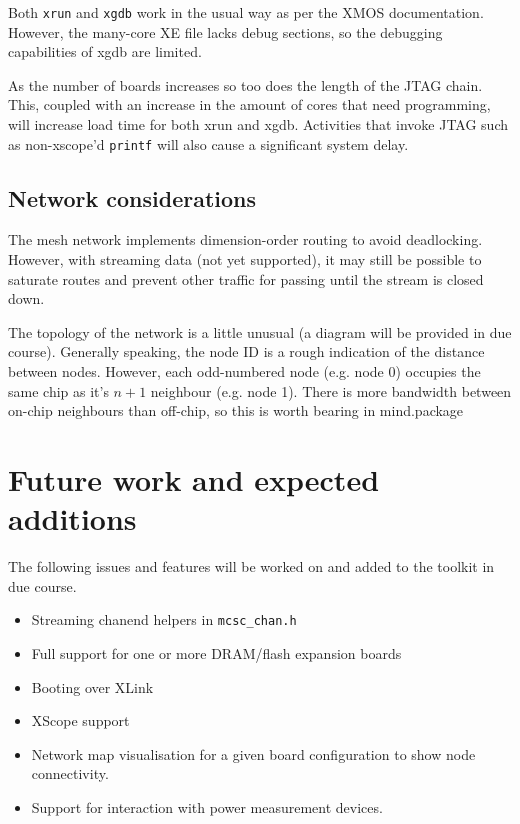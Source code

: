\documentclass[12pt,a4paper,final,twoside]{article}
\begin{document}
Both \texttt{xrun} and \texttt{xgdb} work in the usual way as per the XMOS documentation. However, the many-core XE file lacks debug sections, so the debugging capabilities of xgdb are limited.

As the number of boards increases so too does the length of the JTAG chain. This, coupled with an increase in the amount of cores that need programming, will increase load time for both xrun and xgdb. Activities that invoke JTAG such as non-xscope'd \texttt{printf} will also cause a significant system delay.

\subsection{Network considerations}

The mesh network implements dimension-order routing to avoid deadlocking. However, with streaming data (not yet supported), it may still be possible to saturate routes and prevent other traffic for passing until the stream is closed down.

The topology of the network is a little unusual (a diagram will be provided in due course). Generally speaking, the node ID is a rough indication of the distance between nodes. However, each odd-numbered node (e.g. node 0) occupies the same chip as it's $n+1$ neighbour (e.g. node 1). There is more bandwidth between on-chip neighbours than off-chip, so this is worth bearing in mind.package

\section{Future work and expected additions}

The following issues and features will be worked on and added to the toolkit in due course.

\begin{itemize}
\item Streaming chanend helpers in \texttt{mcsc\_chan.h}
\item Full support for one or more DRAM/flash expansion boards
\item Booting over XLink
\item XScope support
\item Network map visualisation for a given board configuration to show node connectivity.
\item Support for interaction with power measurement devices.
\end{itemize}
\end{document}
